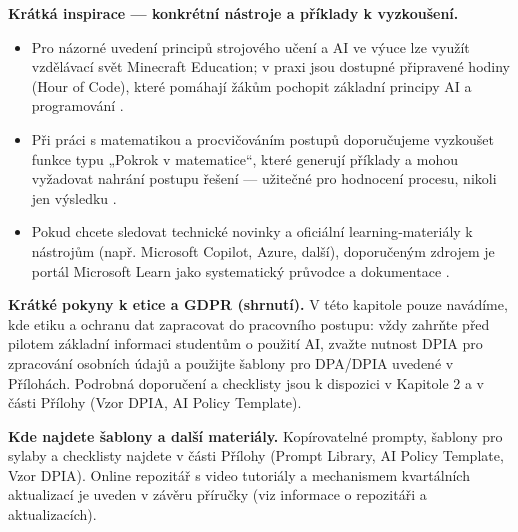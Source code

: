 \medskip

\textbf{Krátká inspirace — konkrétní nástroje a příklady k vyzkoušení.}
\begin{itemize}
  \item Pro názorné uvedení principů strojového učení a AI ve výuce lze využít vzdělávací svět Minecraft Education; v praxi jsou dostupné připravené hodiny (Hour of Code), které pomáhají žákům pochopit základní principy AI a programování \cite{kb_ai_101_tipu_pdf_04e4a115_page_15_2}.
  \item Při práci s matematikou a procvičováním postupů doporučujeme vyzkoušet funkce typu „Pokrok v matematice“, které generují příklady a mohou vyžadovat nahrání postupu řešení — užitečné pro hodnocení procesu, nikoli jen výsledku \cite{kb_ai_101_tipu_pdf_04e4a115_page_8_1}.
  \item Pokud chcete sledovat technické novinky a oficiální learning‑materiály k nástrojům (např. Microsoft Copilot, Azure, další), doporučeným zdrojem je portál Microsoft Learn jako systematický průvodce a dokumentace \cite{kb_ai_101_tipu_pdf_04e4a115_page_54_1}.
\end{itemize}

\medskip

\textbf{Krátké pokyny k etice a GDPR (shrnutí).} V této kapitole pouze navádíme, kde etiku a ochranu dat zapracovat do pracovního postupu: vždy zahrňte před pilotem základní informaci studentům o použití AI, zvažte nutnost DPIA pro zpracování osobních údajů a použijte šablony pro DPA/DPIA uvedené v Přílohách. Podrobná doporučení a checklisty jsou k dispozici v Kapitole 2 a v části Přílohy (Vzor DPIA, AI Policy Template).

\medskip

\textbf{Kde najdete šablony a další materiály.} Kopírovatelné prompty, šablony pro sylaby a checklisty najdete v části Přílohy (Prompt Library, AI Policy Template, Vzor DPIA). Online repozitář s video tutoriály a mechanismem kvartálních aktualizací je uveden v závěru příručky (viz informace o repozitáři a aktualizacích).